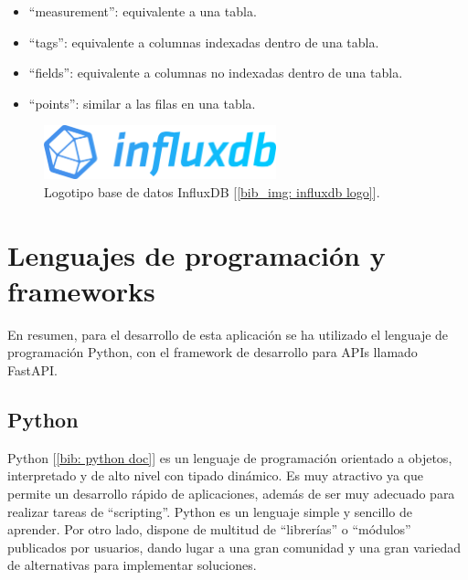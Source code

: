 \documentclass[a4paper, oneside, 12pt]{book}
\begin{document}
	\begin{itemize}
		\item ``measurement'': equivalente a una tabla.
		\item ``tags'': equivalente a columnas indexadas dentro de una tabla.
		\item ``fields'': equivalente a columnas no indexadas dentro de una tabla.
		\item ``points'': similar a las filas en una tabla.
	\end{itemize}

	\vspace{20px}

	\begin{figure}[h!]
		\begin{center}
			\includegraphics[width=0.6\textwidth]{img/InfluxDB.png}
			\caption{Logotipo base de datos InfluxDB [\ref{bib_img: influxdb logo}].}
			\label{img: influxdb logo}
		\end{center}
	\end{figure}

	\pagebreak
	
	
	\pagebreak
	
	\section[Lenguajes y frameworks]{Lenguajes de programación y frameworks}
	
	\noindent En resumen, para el desarrollo de esta aplicación se ha utilizado el lenguaje de programación Python, con el framework de desarrollo para APIs llamado FastAPI.
	
	\subsection{Python}
	
	\noindent Python [\ref{bib: python doc}] es un lenguaje de programación orientado a objetos, interpretado y de alto nivel con tipado dinámico. Es muy atractivo ya que permite un desarrollo rápido de aplicaciones, además de ser muy adecuado para realizar tareas de ``scripting''. Python es un lenguaje simple y sencillo de aprender. Por otro lado, dispone de multitud de ``librerías'' o ``módulos'' publicados por usuarios, dando lugar a una gran comunidad y una gran variedad de alternativas para implementar soluciones. \\
	
\end{document}
